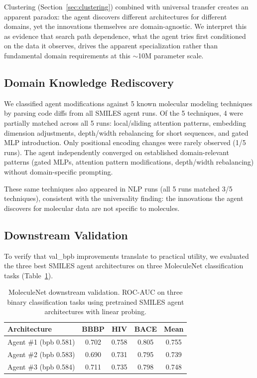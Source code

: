Clustering (Section~\ref{sec:clustering}) combined with universal transfer creates an apparent paradox: the agent discovers different architectures for different domains, yet the innovations themselves are domain-agnostic. We interpret this as evidence that search path dependence, what the agent tries first conditioned on the data it observes, drives the apparent specialization rather than fundamental domain requirements at this ${\sim}$10M parameter scale.

\subsection{Domain Knowledge Rediscovery}
\label{sec:rediscovery}

We classified agent modifications against 5 known molecular modeling techniques by parsing code diffs from all SMILES agent runs. Of the 5 techniques, 4 were partially matched across all 5 runs: local/sliding attention patterns, embedding dimension adjustments, depth/width rebalancing for short sequences, and gated MLP introduction. Only positional encoding changes were rarely observed (1/5 runs). The agent independently converged on established domain-relevant patterns (gated MLPs, attention pattern modifications, depth/width rebalancing) without domain-specific prompting.

These same techniques also appeared in NLP runs (all 5 runs matched 3/5 techniques), consistent with the universality finding: the innovations the agent discovers for molecular data are not specific to molecules.

\subsection{Downstream Validation}
\label{sec:downstream}

To verify that val\_bpb improvements translate to practical utility, we evaluated the three best SMILES agent architectures on three MoleculeNet \citep{wu2018moleculenet} classification tasks (Table~\ref{tab:moleculenet}).

\begin{table}[t]
\centering
\caption{MoleculeNet downstream validation. ROC-AUC on three binary classification tasks using pretrained SMILES agent architectures with linear probing.}
\label{tab:moleculenet}
\small
\begin{tabular}{@{}lcccc@{}}
\toprule
\textbf{Architecture} & \textbf{BBBP} & \textbf{HIV} & \textbf{BACE} & \textbf{Mean} \\
\midrule
Agent \#1 (bpb 0.581) & 0.702 & 0.758 & 0.805 & 0.755 \\
Agent \#2 (bpb 0.583) & 0.690 & 0.731 & 0.795 & 0.739 \\
Agent \#3 (bpb 0.584) & 0.711 & 0.735 & 0.798 & 0.748 \\
\bottomrule
\end{tabular}
\end{table}

